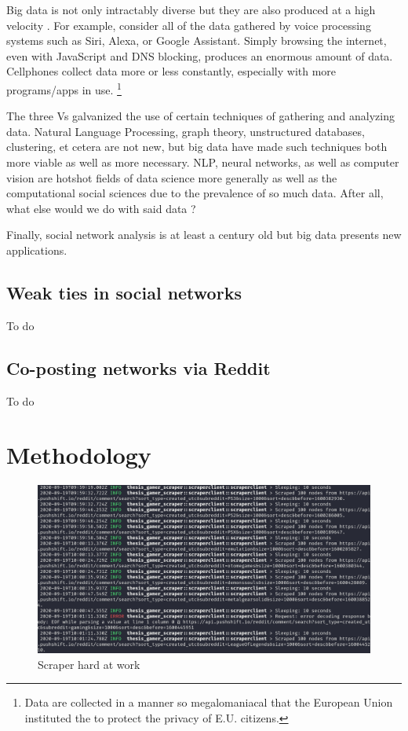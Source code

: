 \documentclass[12pt, a4paper]{article}
\begin{document}
Big data is not only intractably diverse but they are also produced at a high velocity \cite{gandomiamir2015}. For example, consider all of the data gathered by voice processing systems such as Siri, Alexa, or Google Assistant. Simply browsing the internet, even with JavaScript and DNS blocking, produces an enormous amount of data. Cellphones collect data more or less constantly, especially with more programs/apps in use. \footnote{Data are collected in a manner so megalomaniacal that the European Union instituted the  to protect the privacy of E.U. citizens.}

The three Vs galvanized the use of certain techniques of gathering and analyzing data. Natural Language Processing, graph theory, unstructured databases, clustering, et cetera are not new, but big data have made such techniques both more viable as well as more necessary. NLP, neural networks, as well as computer vision are hotshot fields of data science more generally as well as the computational social sciences due to the prevalence of so much data. After all, what else would we do with said data \cite{gandomiamir2015}? 

Finally, social network analysis is at least a century old but big data presents new applications. 

\subsection{Weak ties in social networks}
To do\cite{granovetter1973}

\subsection{Co-posting networks via Reddit}
To do \cite{}

\section{Methodology}

\begin{figure}[h!]
  \includegraphics[width=\linewidth]{scraper_at_work.png}
  \caption{Scraper hard at work}
  \label{fig:workingscraper}
\end{figure}
\end{document}
